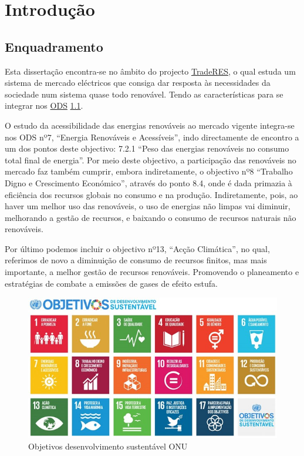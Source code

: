 \chapter{Introdução}

\section{Enquadramento \label{se:enquadramento}}
Esta dissertação encontra-se no âmbito do projecto \href{https://traderes.eu/}{TradeRES}, o qual estuda um sistema de mercado eléctricos que consiga dar resposta às necessidades da sociedade num sistema quase todo renovável. Tendo as características para se integrar nos \href{https://ods.pt/ods/}{ODS} \ref{fig:ODS}.

O estudo da acessibilidade das energias renováveis ao mercado vigente integra-se nos ODS nº7, “Energia Renováveis e Acessíveis”, indo directamente de encontro a um dos pontos deste objectivo: 7.2.1 “Peso das energias renováveis no consumo total final de energia”. Por meio deste objectivo, a participação das renováveis no mercado faz também cumprir, embora indiretamente, o objectivo nº8 “Trabalho Digno e Crescimento Económico”, através do ponto 8.4, onde é dada primazia à eficiência dos recursos globais no consumo e na produção. Indiretamente, pois, ao haver um melhor uso das renováveis, o uso de energias não limpas vai diminuir, melhorando a gestão de recursos, e baixando o consumo de recursos naturais não renováveis.

Por último podemos incluir o objectivo nº13, “Acção Climática”, no qual, referimos de novo a diminuição de consumo de recursos finitos, mas mais importante, a melhor gestão de recursos renováveis. Promovendo o planeamento e estratégias de combate a emissões de gases de efeito estufa.


\begin{figure}[h]
    \centering
    \includegraphics{Imagens/DesenvolvimentoSustentavel.jpg}
    \caption{Objetivos desenvolvimento sustentável ONU}
    \label{fig:ODS}
\end{figure}


